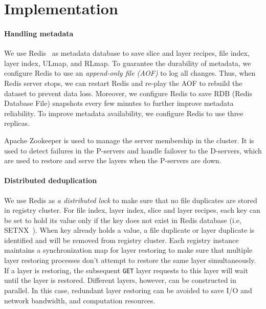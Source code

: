 \section{Implementation}
\label{sec:impl}

\paragraph{Handling metadata}
We use Redis~\cite{redis} as metadata database to save slice and layer recipes, file index, layer index, ULmap, and RLmap.
To guarantee the durability of metadata, 
we configure Redis to use an \emph{append-only file (AOF)} to log all changes.
Thus, when Redis server stops, we can restart Redis and re-play the AOF to rebuild the dataset to prevent data loss.
Moreover, we configure Redis to save RDB (Redis Database File) snapshots every few minutes to further improve metadata reliability. 
To improve metadata availability, 
we configure Redis to use three replicas.

Apache Zookeeper is used to manage the server membership in the cluster. 
It is used to detect failures in the P-servers and handle failover to the D-servers, 
which are used to restore and serve the layers when the P-servers are down.

\paragraph{Distributed deduplication}
We use Redis as \emph{a distributed lock} 
to make sure that no file duplicates are stored in registry cluster.
For file index, layer index, slice and layer recipes, 
each key can be set to hold its value only if 
the key does not exist in Redis database (i.e, SETNX~\cite{SETNX}).
When key already holds a value, a file duplicate or 
layer duplicate is identified and will be removed from registry cluster. 
Each registry instance 
maintains a synchronization map 
for layer restoring to make sure that multiple layer restoring processes 
don't attempt to restore the same layer simultaneously.
If a layer is restoring, the subsequent
\texttt{GET} layer requests to this layer will wait until the layer is restored.
 Different layers, however, can be constructed in parallel. 
 In this case, redundant layer restoring can be avoided to save I/O and network bandwidth, and computation resources.
 
